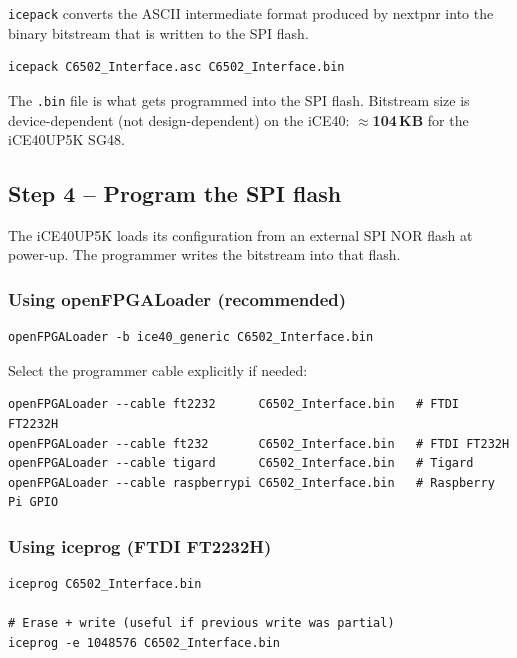 \documentclass[11pt,a4paper]{article}
\newcommand{\cmd}[1]{\texttt{#1}}
\newcommand{\file}[1]{\texttt{#1}}
\begin{document}
\cmd{icepack} converts the ASCII intermediate format produced by
nextpnr into the binary bitstream that is written to the SPI flash.

\begin{lstlisting}[style=shell,caption={Pack the binary bitstream}]
icepack C6502_Interface.asc C6502_Interface.bin
\end{lstlisting}

The \file{.bin} file is what gets programmed into the SPI flash.
Bitstream size is device-dependent (not design-dependent) on the iCE40:
\textbf{$\approx$104\,KB} for the iCE40UP5K SG48.

\subsection{Step 4 -- Program the SPI flash}

The iCE40UP5K loads its configuration from an external SPI NOR flash
at power-up.  The programmer writes the bitstream into that flash.

\subsubsection{Using openFPGALoader (recommended)}

\begin{lstlisting}[style=shell,caption={Program with openFPGALoader}]
openFPGALoader -b ice40_generic C6502_Interface.bin
\end{lstlisting}

Select the programmer cable explicitly if needed:

\begin{lstlisting}[style=shell]
openFPGALoader --cable ft2232      C6502_Interface.bin   # FTDI FT2232H
openFPGALoader --cable ft232       C6502_Interface.bin   # FTDI FT232H
openFPGALoader --cable tigard      C6502_Interface.bin   # Tigard
openFPGALoader --cable raspberrypi C6502_Interface.bin   # Raspberry Pi GPIO
\end{lstlisting}

\subsubsection{Using iceprog (FTDI FT2232H)}

\begin{lstlisting}[style=shell,caption={Program with iceprog}]
iceprog C6502_Interface.bin

# Erase + write (useful if previous write was partial)
iceprog -e 1048576 C6502_Interface.bin
\end{lstlisting}
\end{document}
